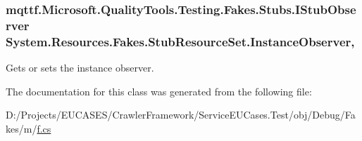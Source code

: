 \hypertarget{class_system_1_1_resources_1_1_fakes_1_1_stub_resource_set_afe04a88ec6c90a61948a9429740e7a25}{
\subsubsection[{Instance\-Observer}]{\setlength{\rightskip}{0pt plus 5cm}mqttf.\-Microsoft.\-Quality\-Tools.\-Testing.\-Fakes.\-Stubs.\-I\-Stub\-Observer System.\-Resources.\-Fakes.\-Stub\-Resource\-Set.\-Instance\-Observer\hspace{0.3cm}{\ttfamily [get]}, {\ttfamily [set]}}}\label{class_system_1_1_resources_1_1_fakes_1_1_stub_resource_set_afe04a88ec6c90a61948a9429740e7a25}


Gets or sets the instance observer.



The documentation for this class was generated from the following file\-:\begin{DoxyCompactItemize}
\item 
D\-:/\-Projects/\-E\-U\-C\-A\-S\-E\-S/\-Crawler\-Framework/\-Service\-E\-U\-Cases.\-Test/obj/\-Debug/\-Fakes/m/\hyperlink{m_2f_8cs}{f.\-cs}\end{DoxyCompactItemize}
